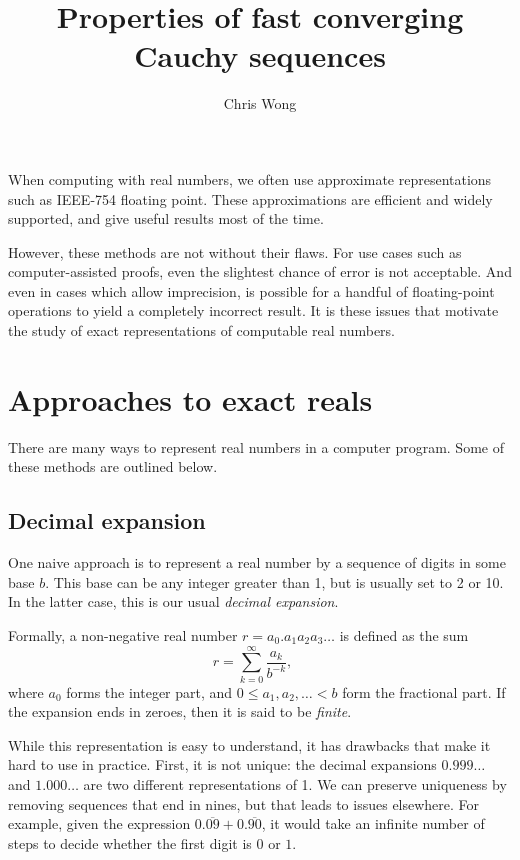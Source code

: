 \documentclass[leqno]{report}
\begin{document}
\author{Chris Wong}
\title{Properties of fast converging Cauchy sequences}
\maketitle

When computing with real numbers, we often use approximate representations such as IEEE-754 floating point. These approximations are efficient and widely supported, and give useful results most of the time.

However, these methods are not without their flaws. For use cases such as computer-assisted proofs, even the slightest chance of error is not acceptable. And even in cases which allow imprecision, is possible for a handful of floating-point operations to yield a completely incorrect result. It is these issues that motivate the study of exact representations of computable real numbers.

\chapter{Approaches to exact reals}

There are many ways to represent real numbers in a computer program. Some of these methods are outlined below.

\section{Decimal expansion}

One naive approach is to represent a real number by a sequence of digits in some base $b$. This base can be any integer greater than 1, but is usually set to 2 or 10. In the latter case, this is our usual \textit{decimal expansion}.

Formally, a non-negative real number $r = a_0 . a_1 a_2 a_3 \ldots$ is defined as the sum
\[
    r = \sum_{k=0}^\infty \frac{a_k}{b^{-k}},\quad
\]
where $a_0$ forms the integer part, and $0 \leq a_1, a_2, \ldots < b$ form the fractional part. If the expansion ends in zeroes, then it is said to be \textit{finite}.

While this representation is easy to understand, it has drawbacks that make it hard to use in practice. First, it is not unique: the decimal expansions $0.999\ldots$ and $1.000\ldots$ are two different representations of 1. We can preserve uniqueness by removing sequences that end in nines, but that leads to issues elsewhere. For example, given the expression $0.\overline{09} + 0.\overline{90}$, it would take an infinite number of steps to decide whether the first digit is $0$ or $1$.
\end{document}
